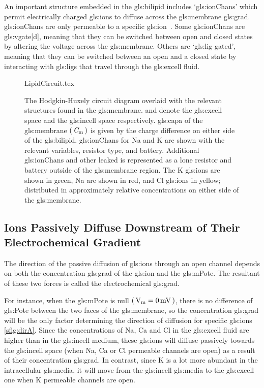 \documentclass[class={myRUCProject}, crop=false]{standalone}
\begin{document}
An important structure embedded in the \gls{gls:bilipid} includes `\glspl{gls:ionChan}' which permit electrically charged \glspl{gls:ion} to diffuse across the \gls{gls:membrane} \gls{gls:grad}. \Glspl{gls:ionChan} are only permeable to a specific \gls{gls:ion}~\cite{}. Some \glspl{gls:ionChan} are \gls{gls:vgate}[d], meaning that they can be switched between open and closed states by altering the voltage across the \gls{gls:membrane}. 
Others are `\gls{gls:lig} gated', meaning that they can be switched between an open and a closed state by interacting with \glspl{gls:lig} that travel through the \gls{gls:excell} fluid. 

\vspace{1em}

\begin{figure}[H]
    \centering
    {LipidCircuit.tex}
    \caption{The Hodgkin-Huxely circuit diagram overlaid with the relevant structures found in the \gls{gls:membrane}.  and  denote the \gls{gls:excell} space and the \gls{gls:incell} space respectively. \Gls{gls:capa} of the \gls{gls:membrane} \(\left(\,\mathit{C}_\mathrm{m}\,\right)\) is given by the charge difference on either side of the \gls{gls:bilipid}. \Glspl{gls:ionChan} for \gls{Na} and \gls{K} are shown with the relevant variables, resistor type, and battery. Additional \glspl{gls:ionChan} and other leaked is represented as a lone resistor and battery outside of the \gls{gls:membrane} region. The \gls{K} \glspl{gls:ion} are shown in green, \gls{Na} are shown in red, and \gls{Cl} \glspl{gls:ion} in yellow; distributed in approximately relative concentrations on either side of the \gls{gls:membrane}. }\label{fig:MembraneCircut}
\end{figure}


\subsection{Ions Passively Diffuse Downstream of Their Electrochemical Gradient}
The direction of the passive diffusion of \glspl{gls:ion} through an open channel depends on both the concentration \gls{gls:grad} of the \gls{gls:ion} and the \gls{gls:mPote}. The resultant of these two forces is called the electrochemical \gls{gls:grad}.

For instance, when the \gls{gls:mPote} is null \(\br{\unit{\V\membrane}=\qty{0}{\mV}}\), there is no difference of \gls{gls:Pote} between the two faces of the \gls{gls:membrane}, so the concentration \gls{gls:grad} will be the only factor determining the direction of diffusion for specific \glspl{gls:ion} \cref{sfig:dirA}. Since the concentrations of \gls{Na}, \gls{Ca} and \gls{Cl} in the \gls{gls:excell} fluid are higher than in the \gls{gls:incell} medium, these \glspl{gls:ion} will diffuse passively towards the \gls{gls:incell} space (when \gls{Na}, \gls{Ca} or \gls{Cl} permeable channels are open) as a result of their concentration \gls{gls:grad}. In contrast, since \gls{K} is a lot more abundant in the intracellular \gls{gls:media}, it will move from the \gls{gls:incell} \gls{gls:media} to the \gls{gls:excell} one when \gls{K} permeable channels are open. 
\end{document}
